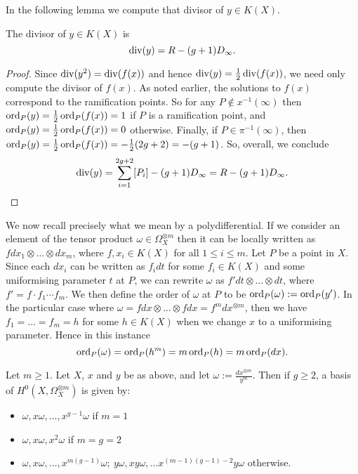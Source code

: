In the following lemma we compute that divisor of $y \in K(X)$.
    \begin{lem}\label{lemmadivisorofycharacteristicnot2}
    The divisor of $y \in K(X)$ is 
        \begin{equation}\label{equationdivisorofypnot2}
        \operatorname{div}(y)  = R - (g+1)D_\infty.
        \end{equation}
    \end{lem}
    \begin{proof}
    Since $\operatorname{div} (y^2) = \operatorname{div} (f(x))$ and hence $\operatorname{div}(y) = \frac{1}{2}\operatorname{div}(f(x))$, we need only compute the divisor of $f(x)$.
    As noted earlier, the solutions to $f(x)$ correspond to the ramification points.
    So for any $P\notin x^{-1}(\infty)$ then $\operatorname{ord}_P(y) =  \frac{1}{2}\operatorname{ord}_P(f(x)) = 1$ if $P$ is a ramification point, and $\operatorname{ord}_P(y) = \frac{1}{2}\operatorname{ord}_P(f(x)) = 0$ otherwise.
    Finally, if $P\in \pi^{-1}(\infty)$, then $\operatorname{ord}_P(y)  = \frac{1}{2}\operatorname{ord}_P(f(x)) = - \frac{1}{2} (2g+2) = -(g+1)$.
    So, overall, we conclude
        \[
        \operatorname{div}(y) = \sum_{i=1}^{2g+2} [P_i]- (g+1)D_\infty = R - (g+1)D_{\infty}.
        \]
    \end{proof}



We now recall precisely what we mean by a polydifferential.
If we consider an element of the tensor product $\omega \in \Omega_X^{\otimes m}$ then it can be locally written as $f dx_1\otimes \ldots \otimes dx_m$, where $f, x_i \in K(X)$ for all $1 \leq i \leq m$.
Let $P$ be a point in $X$.
Since each $dx_i$ can be written as $f_i dt$ for some $f_i\in K(X)$ and some uniformising parameter $t$ at $P$, we can rewrite $\omega$ as $f' dt \otimes \ldots \otimes dt$, where $f' = f \cdot f_1 \cdots f_m$.
We then define the order of $\omega$ at $P$ to be $\operatorname{ord}_P(\omega ) := \operatorname{ord}_P(y')$.
In the particular case where $\omega = fdx \otimes \ldots \otimes fdx = f^m dx^{\otimes m}$, then we have $f_1 = \ldots = f_m = h$ for some $h \in K(X)$ when we change $x$ to a uniformising parameter.
Hence in this instance 
    \[ 
    \operatorname{ord}_P(\omega) = \operatorname{ord}_P(h^m) = m\operatorname{ord}_P(h) = m\operatorname{ord}_P(dx).
    \]



    \begin{prop}\label{prophyperellipticbasispnot2}
    Let $m\geq 1$.
    Let $X$, $x$ and $y$ be as above, and let $\omega := \frac{dx^{\otimes m}}{y^m}$. 
    Then if $g\geq 2$, a basis of $H^0(X,\Omega_X^{\otimes m})$ is given by:
        \begin{itemize}
        \item $\omega, x\omega, \ldots , x^{g-1}\omega$ if $m=1$ 
        \item $\omega, x\omega, x^2\omega$  if $m=g=2$ 
        \item $\omega, x\omega, \ldots, x^{m(g-1)}\omega;\  y\omega, xy\omega, \ldots x^{(m-1)(g-1)-2}y\omega$ otherwise.
        \end{itemize}
    \end{prop}
    
